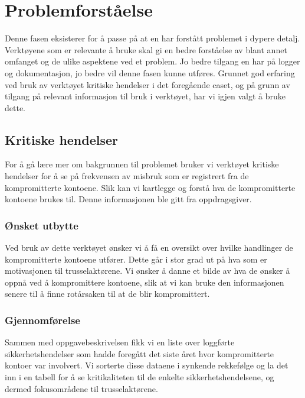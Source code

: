 \chapter{Problemforståelse}
Denne fasen eksisterer for å passe på at en har forstått problemet i dypere detalj. Verktøyene som er relevante å bruke skal gi en bedre forståelse av blant annet omfanget og de ulike aspektene ved et problem. Jo bedre tilgang en har på logger og dokumentasjon, jo bedre vil denne fasen kunne utføres. Grunnet god erfaring ved bruk av verktøyet kritiske hendelser i det foregående caset, og på grunn av tilgang på relevant informasjon til bruk i verktøyet, har vi igjen valgt å bruke dette. 


\section{Kritiske hendelser}
For å gå lære mer om bakgrunnen til problemet bruker vi verktøyet kritiske hendelser for å se på frekvensen av misbruk som er registrert fra de kompromitterte kontoene. Slik kan vi kartlegge og forstå hva de kompromitterte kontoene brukes til. Denne informasjonen ble gitt fra oppdragsgiver.

\subsection{Ønsket utbytte}
Ved bruk av dette verktøyet ønsker vi å få en oversikt over hvilke handlinger de kompromitterte kontoene utfører. Dette går i stor grad ut på hva som er motivasjonen til trusselaktørene. Vi ønsker å danne et bilde av hva de ønsker å oppnå ved å kompromittere kontoene, slik at vi kan bruke den informasjonen senere til å finne rotårsaken til at de blir kompromittert. 

\subsection{Gjennomførelse}
Sammen med oppgavebeskrivelsen fikk vi en liste over loggførte sikkerhetshendelser som hadde foregått det siste året hvor kompromitterte kontoer var involvert. Vi sorterte disse dataene i synkende rekkefølge og la det inn i en tabell for å se kritikaliteten til de enkelte sikkerhetshendelsene, og dermed fokusområdene til trusselaktørene. 

